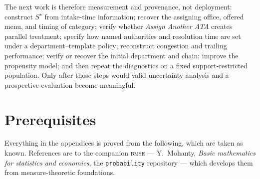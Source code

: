 \documentclass[11pt,a4paper]{article}
\theoremstyle{plain}
\theoremstyle{definition}
\theoremstyle{remark}
\newcommand{\code}[1]{\texttt{\small #1}}
\newcommand{\probrepo}{\textsc{bmse}}
\newcommand{\Sstar}{S^{\star}}
\begin{document}
The next work is therefore measurement and provenance, not deployment: construct $\Sstar$ from
intake-time information; recover the assigning office, offered menu, and timing of category;
verify whether \emph{Assign Another ATA} creates parallel treatment; specify how named
authorities and resolution time are set under a department--template policy;
reconstruct congestion and trailing performance; verify or recover the initial department and
chain; improve the propensity model; and then repeat the diagnostics on a fixed
support-restricted population. Only after those steps would valid uncertainty analysis and a
prospective evaluation become meaningful.

\appendix
\newpage

\section{Prerequisites}\label{app:prereq}

Everything in the appendices is proved from the following, which are taken as known. References
are to the companion \probrepo{} --- Y.\ Mohanty, \emph{Basic mathematics for statistics and
economics}, the \code{probability} repository --- which develops them from measure-theoretic
foundations.
\end{document}
